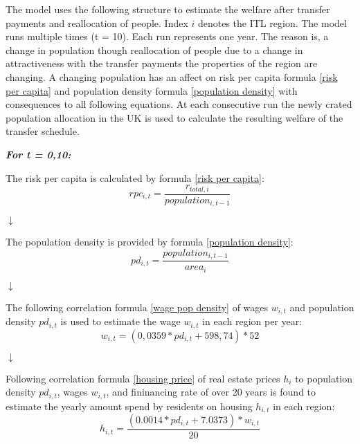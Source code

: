 \documentclass[10pt,a4]{article}
\begin{document}
The model uses the following structure to estimate the welfare after transfer payments and reallocation of people. Index $i$ denotes the ITL region.
The model runs multiple times (t = 10). Each run represents one year. The reason is, a change in population though reallocation of people due to a change in attractiveness with the transfer payments the properties of the region are changing. A changing population has an affect on risk per capita formula \ref{risk per capita} and population density formula \ref{population density} with consequences to all following equations. At each consecutive run the newly crated population allocation in the UK is used to calculate the resulting welfare of the transfer schedule.
\newline
\begin{center}
\textbf{\textit{For t = 0,10:}}\vspace{.5cm}

The risk per capita is calculated by formula \ref{risk per capita}:
\begin{equation}
    rpc_{i,t} = \frac{r_{total,i}}{population_{i,t-1}} 
    \label{risk per capita}
\end{equation}

\begin{center}
    $\downarrow$
\end{center}
The population density is provided by formula \ref{population density}:
\begin{equation}
    pd_{i,t} = \frac{population_{i,t-1}}{area_i}
    \label{population density}
\end{equation}

\begin{center}
    $\downarrow$
\end{center}
The following correlation formula \ref{wage pop density} of wages $w_{i,t}$ and population density $pd_{i,t}$ is used to estimate the wage $w_{i,t}$ in each region per year:
\begin{equation}
    w_{i,t} = (0,0359*pd_{i,t}+598,74) * 52
    \label{wage pop density}
\end{equation}

\begin{center}
    $\downarrow$
\end{center}
Following correlation formula \ref{housing price} of real estate prices $h_i$ to population density $pd_{i,t}$, wages $w_{i,t}$, and fininancing rate of over 20 years is found to estimate the yearly amount spend by residents on housing $h_{i,t}$ in each region:
\begin{equation}
    h_{i,t} = \frac{(0.0014*pd_{i,t}+7.0373) * w_{i,t}}{20}
    \label{housing price}
\end{equation}


\end{center}
\end{document}
